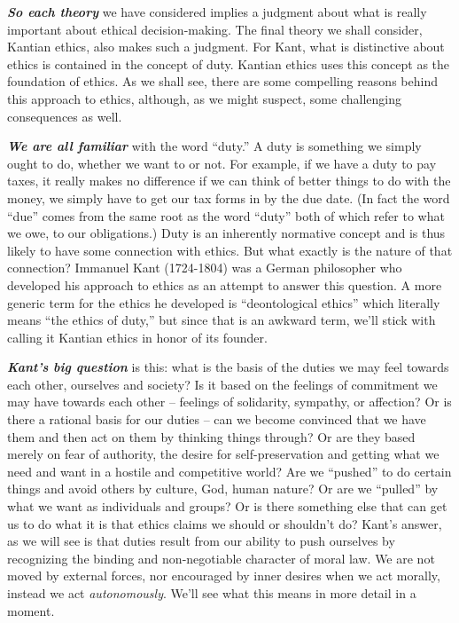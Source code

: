 \documentclass[
  12pt, openany]{book}
\theoremstyle{definition}
\theoremstyle{definition}
\theoremstyle{definition}
\theoremstyle{remark}
\begin{document}
\textbf{\emph{So each theory}} we have considered implies a judgment about what is really important about ethical decision-making. The final theory we shall consider, Kantian ethics, also makes such a judgment. For Kant, what is distinctive about ethics is contained in the concept of duty. Kantian ethics uses this concept as the foundation of ethics. As we shall see, there are some compelling reasons behind this approach to ethics, although, as we might suspect, some challenging consequences as well.

\textbf{\emph{We are all familiar}} with the word ``duty.'' A duty is something we simply ought to do, whether we want to or not. For example, if we have a duty to pay taxes, it really makes no difference if we can think of better things to do with the money, we simply have to get our tax forms in by the due date. (In fact the word ``due'' comes from the same root as the word ``duty'' both of which refer to what we owe, to our obligations.) Duty is an inherently normative concept and is thus likely to have some connection with ethics. But what exactly is the nature of that connection? Immanuel Kant (1724-1804) was a German philosopher who developed his approach to ethics as an attempt to answer this question. A more generic term for the ethics he developed is ``deontological ethics'' which literally means ``the ethics of duty,'' but since that is an awkward term, we'll stick with calling it Kantian ethics in honor of its founder.

\textbf{\emph{Kant's big question}} is this: what is the basis of the duties we may feel towards each other, ourselves and society? Is it based on the feelings of commitment we may have towards each other -- feelings of solidarity, sympathy, or affection? Or is there a rational basis for our duties -- can we become convinced that we have them and then act on them by thinking things through? Or are they based merely on fear of authority, the desire for self-preservation and getting what we need and want in a hostile and competitive world? Are we ``pushed'' to do certain things and avoid others by culture, God, human nature? Or are we ``pulled'' by what we want as individuals and groups? Or is there something else that can get us to do what it is that ethics claims we should or shouldn't do? Kant's answer, as we will see is that duties result from our ability to push ourselves by recognizing the binding and non-negotiable character of moral law. We are not moved by external forces, nor encouraged by inner desires when we act morally, instead we act \emph{autonomously}. We'll see what this means in more detail in a moment.
\end{document}
